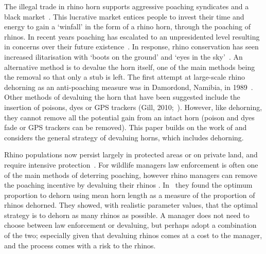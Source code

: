 \documentclass[10pt]{article}
\begin{document}
The illegal trade in rhino horn supports aggressive poaching syndicates and a 
black market~\cite{Nowell1992}. This lucrative market entices people to invest
their time and energy to gain a `winfall' in the form of a rhino horn, through the 
poaching of rhinos. In recent years poaching has escalated to an unpresidented 
level resulting in concerns over their future existence~\cite{Smith1993}. In 
response, rhino conservation has seen increased  ilitarisation with `boots on the 
ground' and `eyes in the sky'~\cite{duffy_st}. An alternative method is to 
devalue the horn itself, one of the main  methods being the removal so that only
a stub is left. The first attempt at large-scale rhino dehorning as an anti-poaching
measure was in Damordond,  Namibia, in 1989~\cite{Milner1992}. Other methods of devaluing the horn that have been suggested include
the insertion of poisons, dyes or GPS trackers (Gill, 2010;~\cite{Smith1993}). However, 
like dehorning, they cannot remove all the potential gain from an intact horn 
(poison and dyes fade or GPS trackers can be removed). This paper builds on 
the work of \cite{Lee} and considers the general strategy of devaluing horns,
which includes dehorning.

Rhino populations now persist largely in protected areas or on private land, and
require intensive protection~\cite{Ferreira2014}. For wildlife managers law 
enforcement is often one of the main methods of deterring poaching, however 
rhino managers can remove the poaching incentive by devaluing their rhinos 
\cite{Milner1992}. In~\cite{Milner1992} they found the 
optimum proportion to dehorn using mean horn length as a measure of the 
proportion of rhinos dehorned. They showed, with realistic parameter values, 
that the optimal strategy is to dehorn as many rhinos as possible. 
A manager does not need to choose between law enforcement or devaluing, but
perhaps adopt a combination of the two; especially given that devaluing rhinos 
comes at a cost to the manager, and the process comes with a risk to the rhinos.
\end{document}
